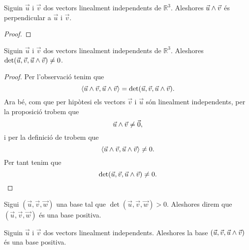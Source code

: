 \documentclass[../Apunts.tex]{subfiles}
\begin{document}
	\begin{proposition}
		\label{prop:dos vectors linealment independents són perpendiculars al seu producte vectorial}
		\label{prop:el producte vectorial és perpendicular als vectors}
		Siguin \(\vec{u}\) i \(\vec{v}\) dos vectors linealment independents de \(\mathbb{R}^{3}\). Aleshores \(\vec{u}\mathbin{\wedge}\vec{v}\) és perpendicular a \(\vec{u}\) i \(\vec{v}\).
	\end{proposition}
	\begin{proof}
	\end{proof}
	\begin{proposition}
		\label{prop:el determinant de dos vectors linealment independents i el seu producte vectorial és diferent de zero}
		Siguin \(\vec{u}\) i \(\vec{v}\) dos vectors linealment independents de \(\mathbb{R}^{3}\). Aleshores \(\det(\vec{u},\vec{v},\vec{u}\mathbin{\wedge}\vec{v})\neq0\).
	\end{proposition}
	\begin{proof}
		Per l'observació  tenim que
		\[\prodesc{\vec{u}\prodvec\vec{v}}{\vec{u}\prodvec\vec{v}}=\det(\vec{u},\vec{v},\vec{u}\prodvec\vec{v}).\]
		Ara bé, com que per hipòtesi els vectors \(\vec{v}\) i \(\vec{u}\) són linealment independents, per la proposició  trobem que
		\[\vec{u}\mathbin{\wedge}\vec{v}\neq\vec{0},\]
		i per la definició de  trobem que
		\[\prodesc{\vec{u}\prodvec\vec{v}}{\vec{u}\prodvec\vec{v}}\neq0.\]
		Per tant tenim que
		\[\det(\vec{u},\vec{v},\vec{u}\mathbin{\wedge}\vec{v})\neq0.\qedhere\]
	\end{proof}
	\begin{definition}
		\label{orientació d'una base}
		\label{def:base positiva}
		Sigui \((\vec{u},\vec{v},\vec{w})\) una base tal que \(\det(\vec{u},\vec{v},\vec{w})>0\). Aleshores direm que \((\vec{u},\vec{v},\vec{w})\) és una base positiva.
	\end{definition}
	\begin{proposition}
		\label{prop:dos vectors linealment independents i el seu producte vectorial formen una base positiva}
		Siguin \(\vec{u}\) i \(\vec{v}\) dos vectors linealment independents. Aleshores la base \((\vec{u},\vec{v},\vec{u}\mathbin{\wedge}\vec{v})\) és una base positiva.
	\end{proposition}
\end{document}
